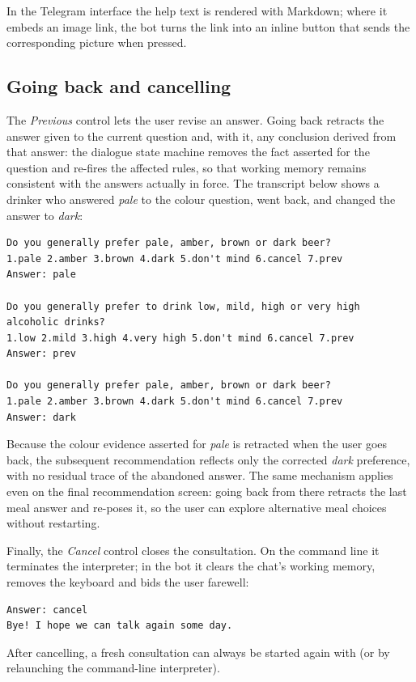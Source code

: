 In the Telegram interface the help text is rendered with Markdown; where it
embeds an image link, the bot turns the link into an inline button that sends the
corresponding picture when pressed.


\subsection{Going back and cancelling}

The \emph{Previous} control lets the user revise an answer. Going back retracts
the answer given to the current question and, with it, any conclusion derived
from that answer: the dialogue state machine removes the fact asserted for the
question and re-fires the affected rules, so that working memory remains
consistent with the answers actually in force. The transcript below shows a
drinker who answered \emph{pale} to the colour question, went back, and changed
the answer to \emph{dark}:

\begin{lstlisting}[numbers=none]
Do you generally prefer pale, amber, brown or dark beer?
1.pale 2.amber 3.brown 4.dark 5.don't mind 6.cancel 7.prev
Answer: pale

Do you generally prefer to drink low, mild, high or very high alcoholic drinks?
1.low 2.mild 3.high 4.very high 5.don't mind 6.cancel 7.prev
Answer: prev

Do you generally prefer pale, amber, brown or dark beer?
1.pale 2.amber 3.brown 4.dark 5.don't mind 6.cancel 7.prev
Answer: dark
\end{lstlisting}

Because the colour evidence asserted for \emph{pale} is retracted when the user
goes back, the subsequent recommendation reflects only the corrected \emph{dark}
preference, with no residual trace of the abandoned answer. The same mechanism
applies even on the final recommendation screen: going back from there retracts
the last meal answer and re-poses it, so the user can explore alternative meal
choices without restarting.

Finally, the \emph{Cancel} control closes the consultation. On the command line
it terminates the interpreter; in the bot it clears the chat's working memory,
removes the keyboard and bids the user farewell:

\begin{lstlisting}[numbers=none]
Answer: cancel
Bye! I hope we can talk again some day.
\end{lstlisting}

After cancelling, a fresh consultation can always be started again with
 (or by relaunching the command-line interpreter).
